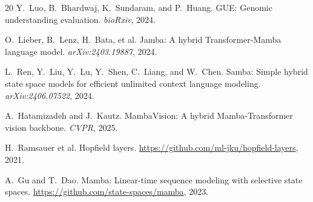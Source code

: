 \documentclass[11pt,a4paper]{article}
\numberwithin{equation}{section}
\begin{document}
\begin{thebibliography}{20}
Y.\ Luo, B.\ Bhardwaj, K.\ Sundaram, and P.\ Huang.
\newblock GUE: Genomic understanding evaluation.
\newblock \textit{bioRxiv}, 2024.

O.\ Lieber, B.\ Lenz, H.\ Bata, et al.
\newblock Jamba: A hybrid Transformer-Mamba language model.
\newblock \textit{arXiv:2403.19887}, 2024.

L.\ Ren, Y.\ Liu, Y.\ Lu, Y.\ Shen, C.\ Liang, and W.\ Chen.
\newblock Samba: Simple hybrid state space models for efficient unlimited
context language modeling.
\newblock \textit{arXiv:2406.07522}, 2024.

A.\ Hatamizadeh and J.\ Kautz.
\newblock MambaVision: A hybrid Mamba-Transformer vision backbone.
\newblock \textit{CVPR}, 2025.

H.\ Ramsauer et al.
\newblock Hopfield layers.
\newblock \url{https://github.com/ml-jku/hopfield-layers}, 2021.

A.\ Gu and T.\ Dao.
\newblock Mamba: Linear-time sequence modeling with selective state spaces.
\newblock \url{https://github.com/state-spaces/mamba}, 2023.

\end{thebibliography}
\end{document}
